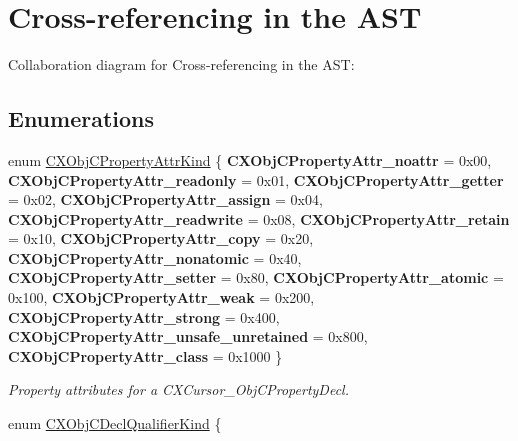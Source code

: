 \hypertarget{group__CINDEX__CURSOR__XREF}{}\section{Cross-\/referencing in the A\+ST}
\label{group__CINDEX__CURSOR__XREF}
Collaboration diagram for Cross-\/referencing in the A\+ST\+:
\subsection*{Enumerations}
\begin{DoxyCompactItemize}
\item 
\mbox{\label{group__CINDEX__CURSOR__XREF_ga7bb83a8c353185d13641f001a4c4b6c7}} 
enum \hyperlink{group__CINDEX__CURSOR__XREF_ga7bb83a8c353185d13641f001a4c4b6c7}{C\+X\+Obj\+C\+Property\+Attr\+Kind} \{ \newline
{\bfseries C\+X\+Obj\+C\+Property\+Attr\+\_\+noattr} = 0x00, 
{\bfseries C\+X\+Obj\+C\+Property\+Attr\+\_\+readonly} = 0x01, 
{\bfseries C\+X\+Obj\+C\+Property\+Attr\+\_\+getter} = 0x02, 
{\bfseries C\+X\+Obj\+C\+Property\+Attr\+\_\+assign} = 0x04, 
\newline
{\bfseries C\+X\+Obj\+C\+Property\+Attr\+\_\+readwrite} = 0x08, 
{\bfseries C\+X\+Obj\+C\+Property\+Attr\+\_\+retain} = 0x10, 
{\bfseries C\+X\+Obj\+C\+Property\+Attr\+\_\+copy} = 0x20, 
{\bfseries C\+X\+Obj\+C\+Property\+Attr\+\_\+nonatomic} = 0x40, 
\newline
{\bfseries C\+X\+Obj\+C\+Property\+Attr\+\_\+setter} = 0x80, 
{\bfseries C\+X\+Obj\+C\+Property\+Attr\+\_\+atomic} = 0x100, 
{\bfseries C\+X\+Obj\+C\+Property\+Attr\+\_\+weak} = 0x200, 
{\bfseries C\+X\+Obj\+C\+Property\+Attr\+\_\+strong} = 0x400, 
\newline
{\bfseries C\+X\+Obj\+C\+Property\+Attr\+\_\+unsafe\+\_\+unretained} = 0x800, 
{\bfseries C\+X\+Obj\+C\+Property\+Attr\+\_\+class} = 0x1000
 \}\begin{DoxyCompactList}\small\item\em Property attributes for a {\ttfamily C\+X\+Cursor\+\_\+\+Obj\+C\+Property\+Decl}. \end{DoxyCompactList}
\item 
\mbox{\label{group__CINDEX__CURSOR__XREF_ga1267244d5761be84f8680e455199bac2}} 
enum \hyperlink{group__CINDEX__CURSOR__XREF_ga1267244d5761be84f8680e455199bac2}{C\+X\+Obj\+C\+Decl\+Qualifier\+Kind} \{ \newline

\end{DoxyCompactItemize}
